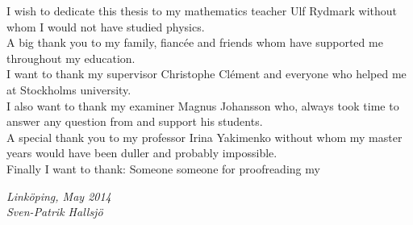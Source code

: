 \begin{acknowledgments}
I wish to dedicate this thesis to my mathematics teacher Ulf Rydmark without whom I would not have studied physics.\\
A big thank you to my family, fiancée and friends whom have supported me throughout my education.\\
I want to thank my supervisor Christophe Clément and everyone who helped me at Stockholms university. \\
I also want to thank my examiner Magnus Johansson who, always took time to answer any question from and support his students. \\ 
A special thank you to my professor Irina Yakimenko without whom my master years would have been duller and probably impossible.\\
Finally I want to thank: Someone someone for proofreading my

  \addvspace{1em}
  \begin{flushright}
    \textit{%
      Linköping, May 2014\\
      Sven-Patrik Hallsjö%
    }
  \end{flushright}
\end{acknowledgments}
